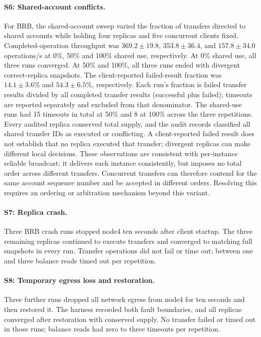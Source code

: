 \documentclass[sigconf,a4paper]{acmart}
\begin{document}
    \paragraph{S6: Shared-account conflicts.}
    For BRB, the shared-account sweep varied the fraction of transfers directed
    to shared accounts while holding four replicas and five concurrent clients
    fixed. Completed-operation throughput was $369.2\pm19.8$, $353.8\pm36.4$,
    and $157.8\pm34.0$ operations/s at 0\%, 50\% and 100\% shared use,
    respectively. At 0\% shared use, all three runs converged. At 50\% and
    100\%, all three runs ended with divergent correct-replica snapshots. The
    client-reported failed-result fraction was $14.1\pm3.6\%$ and
    $54.3\pm6.5\%$, respectively. Each run's fraction is failed transfer
    results divided by all completed transfer results (successful plus failed);
    timeouts are reported separately and excluded from that denominator. The
    shared-use runs had 15 timeouts in total at 50\% and 8 at 100\% across the
    three repetitions. Every audited replica conserved total supply, and the
    audit records classified all shared transfer IDs as executed or conflicting.
    A client-reported failed result does not establish that no replica executed
    that transfer; divergent replicas can make different local decisions. These
    observations are consistent with per-instance reliable broadcast: it
    delivers each instance consistently, but imposes no total order across
    different transfers. Concurrent transfers can therefore contend for the
    same account sequence number and be accepted in different orders. Resolving
    this requires an ordering or arbitration mechanism beyond this variant.

    \paragraph{S7: Replica crash.}
    Three BRB crash runs stopped node4 ten seconds after client startup. The
    three remaining replicas continued to execute transfers and converged to
    matching full snapshots in every run. Transfer operations did not fail or
    time out; between one and three balance reads timed out per repetition.
    \paragraph{S8: Temporary egress loss and restoration.}
    Three further runs dropped all network egress from node4 for ten seconds and
    then restored it. The harness recorded both fault boundaries, and all
    replicas converged after restoration with conserved supply. No transfer
    failed or timed out in those runs; balance reads had zero to three timeouts
    per repetition.
\end{document}
